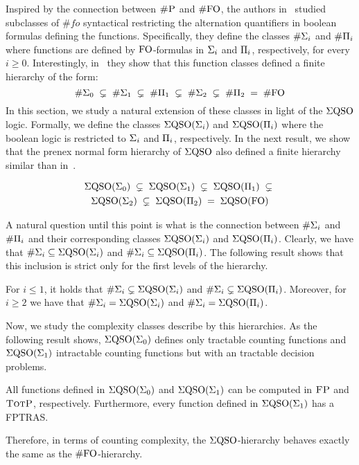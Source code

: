 Inspired by the connection between $\text{\sc \#P}$ and $\#{\rm FO}$, the authors in~\cite{DBLP:journals/jcss/SalujaST95} studied subclasses of  $\#fo$ syntactical restricting the alternation quantifiers in boolean formulas defining the functions.
Specifically, they define the classes $\#\Sigma_{i}$ and $\#\Pi_{i}$ where functions are defined by ${\rm FO}$-formulas in $\Sigma_{i}$ and $\Pi_{i}$, respectively, for every $i \geq 0$. 
Interestingly, in~\cite{DBLP:journals/jcss/SalujaST95} they show that this function classes defined a finite hierarchy of the form:
\[
\#\Sigma_{0} \; \subsetneq \; \#\Sigma_{1} \; \subsetneq \; \#\Pi_{1} \; \subsetneq \; \#\Sigma_{2} \; \subsetneq \; \#\Pi_{2} \; = \; \#{\rm FO} 
\]
In this section, we study a natural extension of these classes in light of the $\Sigma{\rm QSO}$ logic. Formally, we define the classes $\Sigma{\rm QSO}(\Sigma_{i})$ and $\Sigma{\rm QSO}(\Pi_{i})$ where the boolean logic is restricted to $\Sigma_{i}$ and $\Pi_{i}$, respectively. 
In the next result, we show that the prenex normal form hierarchy of $\Sigma{\rm QSO}$ also defined a finite hierarchy similar than in~\cite{DBLP:journals/jcss/SalujaST95}.
\begin{proposition}
\begin{multline*}
\Sigma{\rm QSO}(\Sigma_{0}) \; \subsetneq \; \Sigma{\rm QSO}(\Sigma_{1}) \; \subsetneq \; \Sigma{\rm QSO}(\Pi_{1}) \; \subsetneq \; \\ \Sigma{\rm QSO}(\Sigma_{2}) \; \subsetneq \; \Sigma{\rm QSO}(\Pi_{2}) \; = \; \Sigma{\rm QSO}({\rm FO})
\end{multline*}
\end{proposition}
A natural question until this point is what is the connection between $\#\Sigma_{i}$ and $\#\Pi_{i}$ and their corresponding classes $\Sigma{\rm QSO}(\Sigma_{i})$ and $\Sigma{\rm QSO}(\Pi_{i})$. Clearly, we have that $\#\Sigma_{i} \subseteq \Sigma{\rm QSO}(\Sigma_{i})$ and $\#\Sigma_{i} \subseteq \Sigma{\rm QSO}(\Pi_{i})$.
The following result shows that this inclusion is strict only for the first levels of the hierarchy.
\begin{proposition}
	For $i \leq 1$, it holds that $\#\Sigma_{i} \subsetneq \Sigma{\rm QSO}(\Sigma_{i})$ and $\#\Sigma_{i} \subsetneq \Sigma{\rm QSO}(\Pi_{i})$. Moreover, for $i \geq 2$ we have that $\#\Sigma_{i} = \Sigma{\rm QSO}(\Sigma_{i})$ and $\#\Sigma_{i} = \Sigma{\rm QSO}(\Pi_{i})$.
\end{proposition}

Now, we study the complexity classes describe by this hierarchies. As the following result shows, $\Sigma{\rm QSO}(\Sigma_{0})$ defines only tractable counting functions and $\Sigma{\rm QSO}(\Sigma_{1})$ intractable counting functions but with an tractable decision problems. 
\begin{proposition}
All functions defined in $\Sigma{\rm QSO}(\Sigma_{0})$ and $\Sigma{\rm QSO}(\Sigma_{1})$ can be computed in $\text{\sc FP}$ and $\text{\sc TotP}$, respectively. Furthermore, every function defined in $\Sigma{\rm QSO}(\Sigma_{1})$ has a FPTRAS.
\end{proposition}
Therefore, in terms of counting complexity, the $\Sigma{\rm QSO}$-hierarchy behaves exactly the same as the $\#{\rm FO}$-hierarchy.

